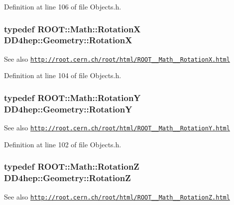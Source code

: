 Definition at line 106 of file Objects.h.\hypertarget{namespace_d_d4hep_1_1_geometry_a42f6ad69a030aba78a706e72c7ef220e}{
\subsubsection[{RotationX}]{\setlength{\rightskip}{0pt plus 5cm}typedef ROOT::Math::RotationX {\bf DD4hep::Geometry::RotationX}}}
\label{namespace_d_d4hep_1_1_geometry_a42f6ad69a030aba78a706e72c7ef220e}
\begin{DoxySeeAlso}{See also}
\href{http://root.cern.ch/root/html/ROOT__Math__RotationX.html}{\tt http://root.cern.ch/root/html/ROOT\_\-\_\-Math\_\-\_\-RotationX.html} 
\end{DoxySeeAlso}


Definition at line 104 of file Objects.h.\hypertarget{namespace_d_d4hep_1_1_geometry_a452190ab96c581a3e59793c7ae11e3f1}{
\subsubsection[{RotationY}]{\setlength{\rightskip}{0pt plus 5cm}typedef ROOT::Math::RotationY {\bf DD4hep::Geometry::RotationY}}}
\label{namespace_d_d4hep_1_1_geometry_a452190ab96c581a3e59793c7ae11e3f1}
\begin{DoxySeeAlso}{See also}
\href{http://root.cern.ch/root/html/ROOT__Math__RotationY.html}{\tt http://root.cern.ch/root/html/ROOT\_\-\_\-Math\_\-\_\-RotationY.html} 
\end{DoxySeeAlso}


Definition at line 102 of file Objects.h.\hypertarget{namespace_d_d4hep_1_1_geometry_ac5c5b2c9ea8e14caecff444e8f9678ec}{
\subsubsection[{RotationZ}]{\setlength{\rightskip}{0pt plus 5cm}typedef ROOT::Math::RotationZ {\bf DD4hep::Geometry::RotationZ}}}
\label{namespace_d_d4hep_1_1_geometry_ac5c5b2c9ea8e14caecff444e8f9678ec}
\begin{DoxySeeAlso}{See also}
\href{http://root.cern.ch/root/html/ROOT__Math__RotationZ.html}{\tt http://root.cern.ch/root/html/ROOT\_\-\_\-Math\_\-\_\-RotationZ.html} 
\end{DoxySeeAlso}



